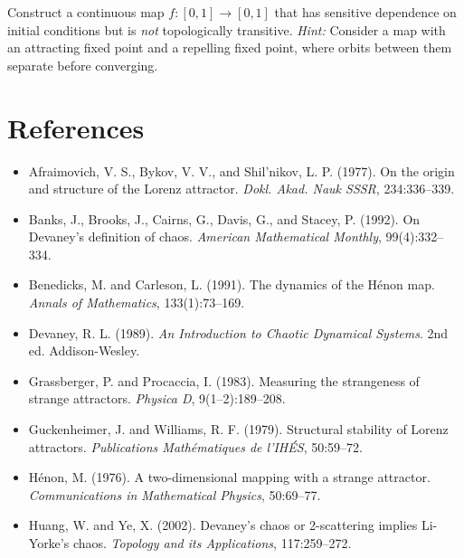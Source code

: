 \begin{exercise}
Construct a continuous map $f: [0,1] \to [0,1]$ that has sensitive dependence on initial conditions but is \textit{not} topologically transitive. \textit{Hint:} Consider a map with an attracting fixed point and a repelling fixed point, where orbits between them separate before converging.


\bigskip

\end{exercise}


\section*{References}

\begin{itemize}[nosep]
  \item Afraimovich, V. S., Bykov, V. V., and Shil'nikov, L. P. (1977). On the origin and structure of the Lorenz attractor. \textit{Dokl. Akad. Nauk SSSR}, 234:336--339.

  \item Banks, J., Brooks, J., Cairns, G., Davis, G., and Stacey, P. (1992). On Devaney's definition of chaos. \textit{American Mathematical Monthly}, 99(4):332--334.

  \item Benedicks, M. and Carleson, L. (1991). The dynamics of the Hénon map. \textit{Annals of Mathematics}, 133(1):73--169.

  \item Devaney, R. L. (1989). \textit{An Introduction to Chaotic Dynamical Systems}. 2nd ed. Addison-Wesley.

  \item Grassberger, P. and Procaccia, I. (1983). Measuring the strangeness of strange attractors. \textit{Physica D}, 9(1--2):189--208.

  \item Guckenheimer, J. and Williams, R. F. (1979). Structural stability of Lorenz attractors. \textit{Publications Mathématiques de l'IHÉS}, 50:59--72.

  \item Hénon, M. (1976). A two-dimensional mapping with a strange attractor. \textit{Communications in Mathematical Physics}, 50:69--77.

  \item Huang, W. and Ye, X. (2002). Devaney's chaos or 2-scattering implies Li-Yorke's chaos. \textit{Topology and its Applications}, 117:259--272.


\end{itemize}
